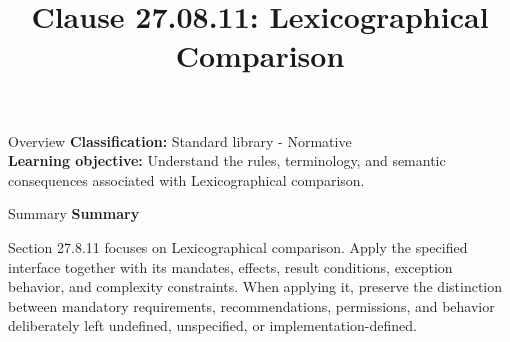 \documentclass[10pt,letterpaper]{article}
\title{Clause 27.08.11: Lexicographical Comparison}
\author{}
\date{}
\begin{document}
\maketitle
\begin{CornellOverviewBox}{Overview}
\textbf{Classification:} Standard library - Normative\\[2pt]
\textbf{Learning objective:} Understand the rules, terminology, and semantic consequences associated with Lexicographical comparison.
\end{CornellOverviewBox}\begin{CornellSummaryBox}{Summary}
{\sffamily\bfseries\color{Accent} Summary}\par\vspace{3pt}Section 27.8.11 focuses on Lexicographical comparison. Apply the specified interface together with its mandates, effects, result conditions, exception behavior, and complexity constraints. When applying it, preserve the distinction between mandatory requirements, recommendations, permissions, and behavior deliberately left undefined, unspecified, or implementation-defined.
\end{CornellSummaryBox}
\end{document}
